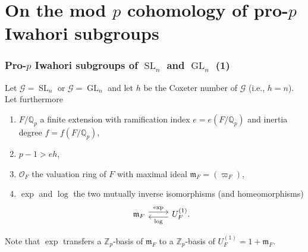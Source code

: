 \documentclass{beamer}
\newcommand*\Z{\mathbb{Z}}
\newcommand*\Q{\mathbb{Q}}
\DeclareMathOperator{\GL}{GL} %
\DeclareMathOperator{\SL}{SL} %
\newcommand*\sO{\mathcal{O}}
\newcommand*\idm{\mathfrak{m}}
\newcommand*\gs[1]{\mathcal{#1}}
\newcommand*\pmat[1]{\begin{pmatrix} #1 \end{pmatrix}}
\begin{document}



\section[mod \texorpdfstring{$p$}{p} cohomology of pro-\texorpdfstring{$p$}{p} Iwahori subgroups]{On the mod \texorpdfstring{$p$}{p} cohomology of pro-\texorpdfstring{$p$}{p} Iwahori subgroups}

\begin{frame}[fragile]
  \frametitle{Pro-$p$ Iwahori subgroups of $\SL_{n}$ and $\GL_{n}$ (1)}

  Let $\gs{G} = \SL_{n}$ or $\gs{G} = \GL_{n}$ and let $h$ be the Coxeter number of $\gs{G}$ (i.e., $h = n$). Let furthermore
  \begin{enumerate}[$\bullet$]
    \item $F/\Q_{p}$ a finite extension with ramification index $e = e(F/\Q_{p})$ and inertia degree $f = f(F/\Q_{p})$,
    \item $p-1 > eh$,
    \item $\sO_{F}$ the valuation ring of $F$ with maximal ideal $\idm_{F} = (\varpi_{F})$,
    \item $\exp$ and $\log$ the two mutually inverse isomorphisms (and homeomorphisms)
          \[
          \begin{tikzcd}
            \idm_{F} \ar[r, yshift=0.7ex, "\exp"] & U_{F}^{(1)}. \ar[l, yshift=-0.7ex, "\log"]
          \end{tikzcd}
          \]
  \end{enumerate}

  Note that $\exp$ transfers a $\Z_{p}$-basis of $\idm_{F}$ to a $\Z_{p}$-basis of $U_{F}^{(1)} = 1 + \idm_{F}$.
\end{frame}
\end{document}
